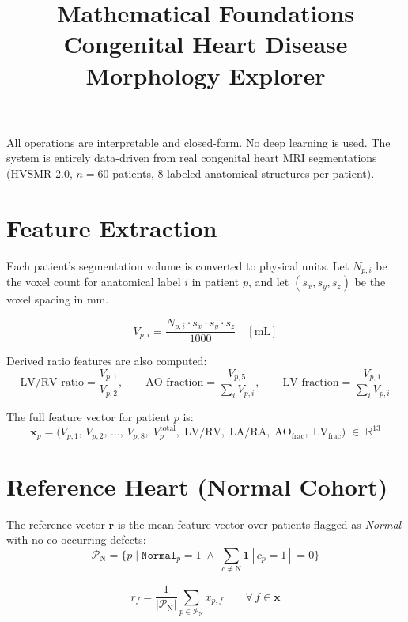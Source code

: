 \documentclass[11pt]{article}
\title{\textbf{Mathematical Foundations}\\[0.4em]
       \large Congenital Heart Disease Morphology Explorer}
\author{}
\date{}
\begin{document}
\maketitle

\noindent
All operations are interpretable and closed-form.
No deep learning is used. The system is entirely data-driven from
real congenital heart MRI segmentations (HVSMR-2.0, $n = 60$ patients,
8 labeled anatomical structures per patient).

\section{Feature Extraction}

Each patient's segmentation volume is converted to physical units.
Let $N_{p,i}$ be the voxel count for anatomical label $i$ in patient $p$,
and let $(s_x, s_y, s_z)$ be the voxel spacing in mm.

\begin{equation}
    V_{p,i} = \frac{N_{p,i} \cdot s_x \cdot s_y \cdot s_z}{1000}
    \quad [\text{mL}]
\end{equation}

Derived ratio features are also computed:
\[
    \text{LV/RV ratio} = \frac{V_{p,1}}{V_{p,2}}, \qquad
    \text{AO fraction} = \frac{V_{p,5}}{\sum_i V_{p,i}}, \qquad
    \text{LV fraction} = \frac{V_{p,1}}{\sum_i V_{p,i}}
\]

The full feature vector for patient $p$ is:
\[
    \mathbf{x}_p = \bigl(V_{p,1},\, V_{p,2},\, \ldots,\, V_{p,8},\;
                        V^\text{total}_p,\;
                        \text{LV/RV},\; \text{LA/RA},\;
                        \text{AO}_\text{frac},\; \text{LV}_\text{frac}
                   \bigr)
    \;\in\; \mathbb{R}^{13}
\]

\section{Reference Heart (Normal Cohort)}

The reference vector $\mathbf{r}$ is the mean feature vector over patients
flagged as \textit{Normal} with no co-occurring defects:
\[
    \mathcal{P}_\text{N} = \bigl\{ p \;\big|\;
        \texttt{Normal}_p = 1 \;\wedge\; \textstyle\sum_{c \neq \text{N}} \mathbf{1}[c_p=1] = 0
    \bigr\}
\]

\begin{equation}
    r_f = \frac{1}{|\mathcal{P}_\text{N}|} \sum_{p \in \mathcal{P}_\text{N}} x_{p,f}
    \qquad \forall\, f \in \mathbf{x}
\end{equation}
\end{document}
